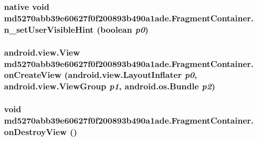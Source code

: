 \hypertarget{classmd5270abb39e60627f0f200893b490a1ade_1_1_fragment_container_be08304fec0177841d7102ecbd8465a0}{
\subsubsection[{n\_\-setUserVisibleHint}]{\setlength{\rightskip}{0pt plus 5cm}native void md5270abb39e60627f0f200893b490a1ade.FragmentContainer.n\_\-setUserVisibleHint (boolean {\em p0})}}
\label{classmd5270abb39e60627f0f200893b490a1ade_1_1_fragment_container_be08304fec0177841d7102ecbd8465a0}


\hypertarget{classmd5270abb39e60627f0f200893b490a1ade_1_1_fragment_container_38270e68e1d2d7f70373ca9c82a31f3f}{
\subsubsection[{onCreateView}]{\setlength{\rightskip}{0pt plus 5cm}android.view.View md5270abb39e60627f0f200893b490a1ade.FragmentContainer.onCreateView (android.view.LayoutInflater {\em p0}, \/  android.view.ViewGroup {\em p1}, \/  android.os.Bundle {\em p2})}}
\label{classmd5270abb39e60627f0f200893b490a1ade_1_1_fragment_container_38270e68e1d2d7f70373ca9c82a31f3f}


\hypertarget{classmd5270abb39e60627f0f200893b490a1ade_1_1_fragment_container_4d7e667cd11efc3b3a5cb5d2e17dda1d}{
\subsubsection[{onDestroyView}]{\setlength{\rightskip}{0pt plus 5cm}void md5270abb39e60627f0f200893b490a1ade.FragmentContainer.onDestroyView ()}}
\label{classmd5270abb39e60627f0f200893b490a1ade_1_1_fragment_container_4d7e667cd11efc3b3a5cb5d2e17dda1d}


